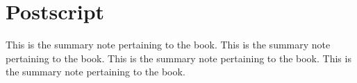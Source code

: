 
\chapter{Postscript}
\label{cha:postscript}

This is the summary note pertaining to the book. This is the
summary note pertaining to the book. This is the summary note
pertaining to the book. This is the summary note pertaining to the
book.

